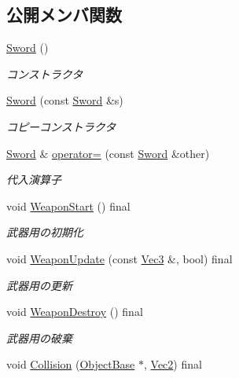\subsection*{公開メンバ関数}
\begin{DoxyCompactItemize}
\item 
\mbox{\hyperlink{class_sword_af33284e40825ec8ddccd01fa5833be36}{Sword}} ()
\begin{DoxyCompactList}\small\item\em コンストラクタ \end{DoxyCompactList}\item 
\mbox{\hyperlink{class_sword_a6a55d930547584000fcc7c63d47ffabf}{Sword}} (const \mbox{\hyperlink{class_sword}{Sword}} \&s)
\begin{DoxyCompactList}\small\item\em コピーコンストラクタ \end{DoxyCompactList}\item 
\mbox{\hyperlink{class_sword}{Sword}} \& \mbox{\hyperlink{class_sword_a47720cf8f0a44a9a30cf586a188a4730}{operator=}} (const \mbox{\hyperlink{class_sword}{Sword}} \&other)
\begin{DoxyCompactList}\small\item\em 代入演算子 \end{DoxyCompactList}\item 
void \mbox{\hyperlink{class_sword_af9027f627d1db6c0ac21d2aa842cff69}{Weapon\+Start}} () final
\begin{DoxyCompactList}\small\item\em 武器用の初期化 \end{DoxyCompactList}\item 
void \mbox{\hyperlink{class_sword_a5fda2f72829b6256ffc3fb18d9d065e8}{Weapon\+Update}} (const \mbox{\hyperlink{common_8h_ab1cb35b3a17c398d8ef71d5f779808bf}{Vec3}} \&, bool) final
\begin{DoxyCompactList}\small\item\em 武器用の更新 \end{DoxyCompactList}\item 
void \mbox{\hyperlink{class_sword_a3f60d8b24b7847d6a84f0941820b711d}{Weapon\+Destroy}} () final
\begin{DoxyCompactList}\small\item\em 武器用の破棄 \end{DoxyCompactList}\item 
void \mbox{\hyperlink{class_sword_a1dcab625754ca097ad814ee544c6a872}{Collision}} (\mbox{\hyperlink{class_object_base}{Object\+Base}} $\ast$, \mbox{\hyperlink{common_8h_ae148fff5818e9444b4ab2288829559bf}{Vec2}}) final

\end{DoxyCompactItemize}

